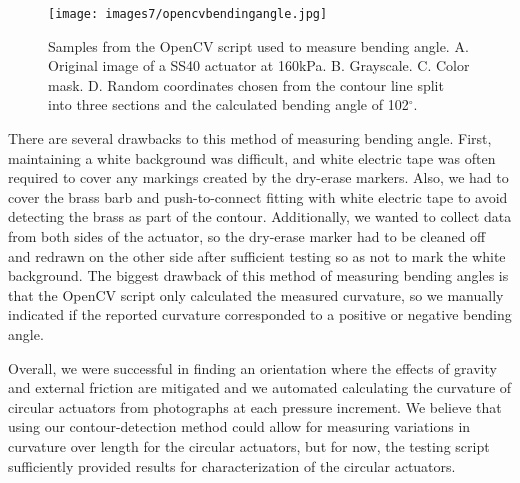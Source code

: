 \begin{figure}[!ht]
    \centering
     \texttt{[image: images7/opencvbendingangle.jpg]}
    \caption{Samples from the OpenCV script used to measure bending angle. A. Original image of a SS40 actuator at 160kPa. B. Grayscale. C. Color mask. D. Random coordinates chosen from the contour line split into three sections and the calculated bending angle of 102$^\circ$.}
    \label{fig:opencvbendingangle}
\end{figure}

\clearpage
There are several drawbacks to this method of measuring bending angle. First, maintaining a white background was difficult, and white electric tape was often required to cover any markings created by the dry-erase markers. Also, we had to cover the brass barb and push-to-connect fitting with white electric tape to avoid detecting the brass as part of the contour. Additionally, we wanted to collect data from both sides of the actuator, so the dry-erase marker had to be cleaned off and redrawn on the other side after sufficient testing so as not to mark the white background. The biggest drawback of this method of measuring bending angles is that the OpenCV script only calculated the measured curvature, so we manually indicated if the reported curvature corresponded to a positive or negative bending angle. 

Overall, we were successful in finding an orientation where the effects of gravity and external friction are mitigated and we automated calculating the curvature of circular actuators from photographs at each pressure increment. We believe that using our contour-detection method could allow for measuring variations in curvature over length for the circular actuators, but for now, the testing script sufficiently provided results for characterization of the circular actuators. 